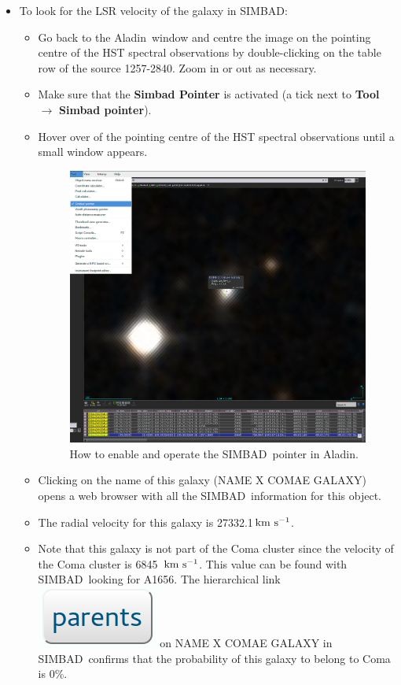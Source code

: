 \documentclass [a4paper, 12pt]{article}
\def\kms{\rm km\ s^{-1}}
\newcommand{\aladin}{{\textsc{A}{ladin}}}
\newcommand{\simbad}{{\textsc{SIMBAD}}}
\begin{document}
\begin{itemize}
\item To look for the LSR velocity of the galaxy in \simbad:
\begin{itemize}
\item Go back to the \aladin\ window and centre the image on the pointing 
centre of the HST spectral observations by double-clicking on the table row of 
the source 1257-2840. Zoom in or out as necessary. 
\item Make sure that the \textbf{Simbad Pointer} is activated (a tick next to 
\textbf{Tool} $\rightarrow$ \textbf{Simbad pointer}). 
\item Hover over of the pointing centre of the HST spectral observations until 
a small window appears. 
\begin{figure}[H]
\center
\includegraphics[width=0.5  
\textwidth]{../images/aladin_simbad_pointer-coma.png}
\caption{How to enable and operate the \simbad\ pointer in \aladin.}
\label{fig:slit}
\end{figure}
\item Clicking on the name of this galaxy (NAME X COMAE GALAXY) opens a web 
browser with all the \simbad\ information for this object. 
\item The radial velocity for this galaxy is 27332.1\,$\kms$. 
\item Note that this galaxy is not part of the Coma cluster since the velocity 
of the Coma cluster is 6845~$\kms$. This value can be found with \simbad\ 
looking for A1656. The hierarchical link \includegraphics[width=0.07 
\textwidth]{../images/simbad_button_parents.png} on NAME X COMAE GALAXY in 
\simbad\ confirms that the probability of this galaxy to belong to Coma is 0\%.
\end{itemize}


\end{itemize}
\end{document}
